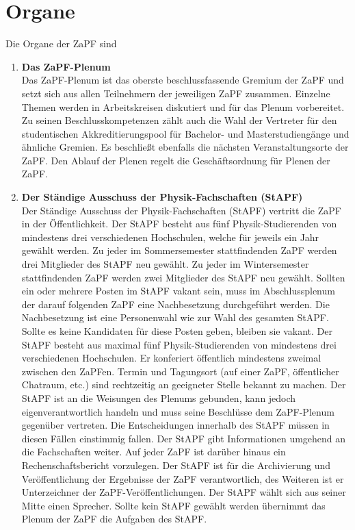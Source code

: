 \documentclass[draft,12pt,oneside]{scrreprt}
\begin{document}
\section{Organe}
  Die Organe der ZaPF sind
  \begin{enumerate}
    \item \textbf{Das ZaPF-Plenum}\\
          Das ZaPF-Plenum ist das oberste beschlussfassende Gremium der ZaPF
          und setzt sich aus allen Teilnehmern der jeweiligen ZaPF zusammen.
          Einzelne Themen werden in Arbeitskreisen diskutiert und für das
          Plenum vorbereitet. Zu seinen Beschlusskompetenzen zählt auch die
          Wahl der Vertreter für den studentischen Akkreditierungspool für
          Bachelor- und Masterstudiengänge und ähnliche Gremien.  Es beschließt
          ebenfalls die nächsten Veranstaltungsorte der ZaPF.  Den Ablauf der
          Plenen regelt die Geschäftsordnung für Plenen der ZaPF.
    \item \textbf{Der Ständige Ausschuss der Physik-Fachschaften (StAPF)}\\
          Der Ständige Ausschuss der Physik-Fachschaften (StAPF) vertritt die
          ZaPF in der Öffentlichkeit. Der StAPF besteht aus fünf Physik-Studierenden
          von mindestens drei verschiedenen Hochschulen, welche für jeweils ein
          Jahr gewählt werden. Zu jeder im Sommersemester stattfindenden ZaPF
          werden drei Mitglieder des StAPF neu gewählt. Zu jeder im Wintersemester
          stattfindenden ZaPF werden zwei Mitglieder des StAPF neu gewählt.
          Sollten ein oder mehrere Posten im StAPF vakant sein, muss im
          Abschlussplenum der darauf folgenden ZaPF eine Nachbesetzung
          durchgeführt werden. Die Nachbesetzung ist eine Personenwahl wie zur
          Wahl des gesamten StAPF. Sollte es keine Kandidaten für diese Posten
          geben, bleiben sie vakant. Der StAPF besteht aus maximal fünf
          Physik-Studierenden von mindestens drei verschiedenen Hochschulen.
          Er konferiert öffentlich mindestens zweimal zwischen den ZaPFen.
          Termin und Tagungsort (auf einer ZaPF, öffentlicher Chatraum, etc.)
          sind rechtzeitig an geeigneter Stelle bekannt zu machen. Der StAPF ist
          an die Weisungen des Plenums gebunden, kann jedoch eigenverantwortlich
          handeln und muss seine Beschlüsse dem ZaPF-Plenum gegenüber vertreten.
          Die Entscheidungen innerhalb des StAPF müssen in diesen Fällen einstimmig
          fallen. Der StAPF gibt Informationen umgehend an die Fachschaften weiter.
          Auf jeder ZaPF ist darüber hinaus ein Rechenschaftsbericht vorzulegen.
          Der StAPF ist für die Archivierung und Veröffentlichung der Ergebnisse
          der ZaPF verantwortlich, des Weiteren ist er Unterzeichner der
          ZaPF-Veröffentlichungen. Der StAPF wählt sich aus seiner Mitte einen
          Sprecher. Sollte kein StAPF gewählt werden übernimmt das Plenum der
          ZaPF die Aufgaben des StAPF.
  \end{enumerate}
\end{document}
